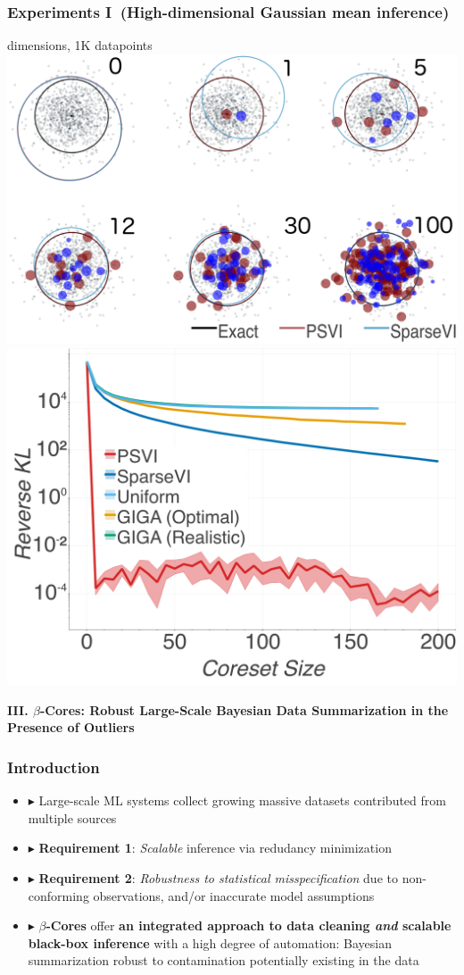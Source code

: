 \documentclass[hyperref={colorlinks = true},unknownkeysallowed]{beamer}
\begin{document}
\begin{frame}
	\frametitle{Experiments I~(High-dimensional Gaussian mean inference)}
	 dimensions, 1K datapoints\\
	\includegraphics[width=.49\textwidth]{figs/d500_pts_combined.png}
	\includegraphics[width=.49\textwidth]{figs/d500_KLDvsCstSize.png}
\end{frame}




\begin{frame}
	\LARGE{\textbf{III. $\beta$-Cores: Robust Large-Scale Bayesian Data Summarization in the Presence of Outliers}}
\end{frame}


\begin{frame}
	\frametitle{Introduction}
	\begin{itemize}
		\item $\blacktriangleright$ Large-scale ML systems collect growing massive datasets contributed from multiple sources
		\item $\blacktriangleright$ \textbf{Requirement 1}: \emph{Scalable} inference via redudancy minimization
		\item $\blacktriangleright$ \textbf{Requirement 2}: \emph{Robustness to statistical misspecification} due to non-conforming observations, and/or inaccurate model assumptions   
		\item $\blacktriangleright$ \textbf{$\beta$-Cores} offer \textbf{an integrated approach to data cleaning \emph{and} scalable black-box inference} with a high degree of automation: Bayesian summarization robust to contamination potentially existing in the data 
	\end{itemize}
\end{frame}
\end{document}
